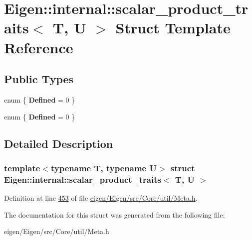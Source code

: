 \hypertarget{struct_eigen_1_1internal_1_1scalar__product__traits}{}\section{Eigen\+:\+:internal\+:\+:scalar\+\_\+product\+\_\+traits$<$ T, U $>$ Struct Template Reference}
\label{struct_eigen_1_1internal_1_1scalar__product__traits}
\subsection*{Public Types}
\begin{DoxyCompactItemize}
\item 
\mbox{\label{struct_eigen_1_1internal_1_1scalar__product__traits_acb9314834b547d28f53fdd5cc74b7b30}} 
enum \{ {\bfseries Defined} = 0
 \}
\item 
\mbox{\label{struct_eigen_1_1internal_1_1scalar__product__traits_a00845a9d43deba950e185531f1c5c3f4}} 
enum \{ {\bfseries Defined} = 0
 \}
\end{DoxyCompactItemize}


\subsection{Detailed Description}
\subsubsection*{template$<$typename T, typename U$>$\newline
struct Eigen\+::internal\+::scalar\+\_\+product\+\_\+traits$<$ T, U $>$}



Definition at line \hyperlink{eigen_2_eigen_2src_2_core_2util_2_meta_8h_source_l00453}{453} of file \hyperlink{eigen_2_eigen_2src_2_core_2util_2_meta_8h_source}{eigen/\+Eigen/src/\+Core/util/\+Meta.\+h}.



The documentation for this struct was generated from the following file\+:\begin{DoxyCompactItemize}
\item 
eigen/\+Eigen/src/\+Core/util/\+Meta.\+h\end{DoxyCompactItemize}
